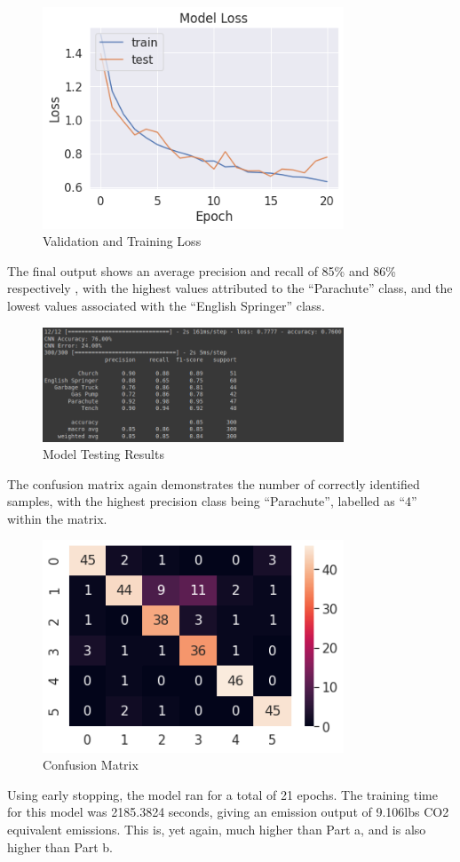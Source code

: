 \begin{figure}[H]
	\centering
	\includegraphics[width=0.8\textwidth]{images/q1/pc/loss}
	\caption{Validation and Training Loss}
	\label{fig:q1pcloss}
\end{figure}

The final output shows an average precision and recall of 85\% and 86\%
respectively , with the highest
values attributed to the ``Parachute'' class, and the lowest values associated
with the ``English Springer'' class.

\begin{figure}[H]
	\centering
	\includegraphics[width=0.8\textwidth]{images/q1/pc/results}
	\caption{Model Testing Results}
	\label{fig:q1pcRes}
\end{figure}

The confusion matrix again demonstrates the number of correctly identified
samples, with the highest precision class being ``Parachute'', labelled as
``4'' within the matrix.

\begin{figure}[H]
	\centering
	\includegraphics[width=0.8\textwidth]{images/q1/pc/matrix}
	\caption{Confusion Matrix}
	\label{fig:q1pcMatrix}
\end{figure}

Using early stopping, the model ran for a total of 21 epochs. The training time
for this model was 2185.3824 seconds, giving an emission output of 9.106lbs CO2
equivalent emissions. This is, yet again, much higher than Part a, and is also
higher than Part b.
